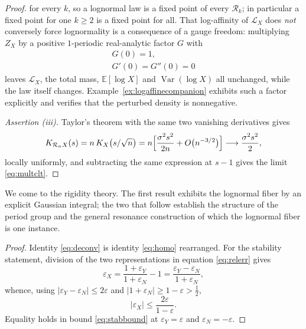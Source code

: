 \documentclass[sn-mathphys-num]{sn-jnl}
\theoremstyle{thmstyleone}%
\theoremstyle{thmstyletwo}%
\theoremstyle{thmstylethree}%
\theoremstyle{thmstyleone}%
\providecommand{\E}{\mathbb{E}}
\providecommand{\Var}{\operatorname{Var}}
\providecommand{\Leh}{\mathscr{L}}
\begin{document}
\begin{appendices}
\begin{proof}
			for every $k$, so a lognormal law is a fixed point of every
			$\mathcal R_k$; in particular a fixed point for one $k\ge2$ is
			a fixed point for all. That log-affinity of $\Leh_X$ does
			\emph{not} conversely force lognormality is a consequence of a
			gauge freedom: multiplying $Z_X$ by a positive $1$-periodic
			real-analytic factor $G$ with
			\begin{equation}\label{eq:gaugenormalized}
				\begin{gathered}
					G(0)=1,\\
					G'(0)=G''(0)=0
				\end{gathered}
			\end{equation}
			leaves $\Leh_X$, the total mass, $\E[\log X]$ and
			$\Var(\log X)$ all unchanged, while the law itself changes.
			Example~\ref{ex:logaffinecompanion} exhibits such a factor
			explicitly and verifies that the perturbed density is
			nonnegative.
			
			\emph{Assertion (iii).} Taylor's theorem
			with the same two vanishing derivatives gives
			\begin{equation}\label{eq:renormlimit}
				K_{\mathcal R_nX}(s)=n\,K_X\bigl(s/\sqrt n\bigr)
				=n\Bigl[\frac{\sigma^2s^2}{2n}+O\bigl(n^{-3/2}\bigr)\Bigr]
				\longrightarrow\frac{\sigma^2s^2}{2},
			\end{equation}
			locally uniformly, and subtracting the same expression at $s-1$
			gives the limit \eqref{eq:multclt}.
		\end{proof}
		
		We come to the rigidity theory. The first result exhibits the
		lognormal fiber by an explicit Gaussian integral; the two that
		follow establish the structure of the period group and the general
		resonance construction of which the lognormal fiber is one
		instance.
		\propdeconv*
		
		\begin{proof}
			Identity \eqref{eq:deconv} is identity \eqref{eq:homo} rearranged.
			For the stability statement, division of the two representations
			in equation \eqref{eq:relerr} gives
			\begin{equation}\label{eq:stabproof}
				\varepsilon_X
				=\frac{1+\varepsilon_Y}{1+\varepsilon_N}-1
				=\frac{\varepsilon_Y-\varepsilon_N}{1+\varepsilon_N},
			\end{equation}
			whence, using $|\varepsilon_Y-\varepsilon_N|\le2\varepsilon$ and
			$|1+\varepsilon_N|\ge1-\varepsilon>\tfrac12$,
			\begin{equation}\label{eq:stabbound}
				|\varepsilon_X|
				\le\frac{2\varepsilon}{1-\varepsilon} .
			\end{equation}
			Equality holds in bound \eqref{eq:stabbound} at
			$\varepsilon_Y=\varepsilon$ and $\varepsilon_N=-\varepsilon$.
		\end{proof}
		

\end{appendices}
\end{document}
